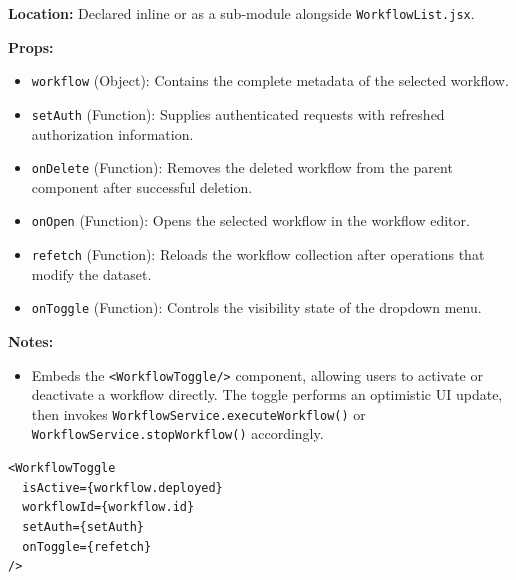 \vspace{0.2cm}
\noindent\textbf{Location:} Declared inline or as a sub-module alongside \texttt{WorkflowList.jsx}.

\vspace{0.2cm}
\noindent\textbf{Props:}
\begin{itemize}
    \item \texttt{workflow} (Object): Contains the complete metadata of the selected workflow.
    \item \texttt{setAuth} (Function): Supplies authenticated requests with refreshed authorization information.
    \item \texttt{onDelete} (Function): Removes the deleted workflow from the parent component after successful deletion.
    \item \texttt{onOpen} (Function): Opens the selected workflow in the workflow editor.
    \item \texttt{refetch} (Function): Reloads the workflow collection after operations that modify the dataset.
    \item \texttt{onToggle} (Function): Controls the visibility state of the dropdown menu.
\end{itemize}

\vspace{0.2cm}
\noindent\textbf{Notes:}
\begin{itemize}
    \item Embeds the \texttt{<WorkflowToggle/>} component, allowing users to activate or deactivate a workflow directly. The toggle performs an optimistic UI update, then invokes \texttt{WorkflowService.executeWorkflow()} or \texttt{WorkflowService.stopWorkflow()} accordingly.
\end{itemize}

\begin{center}
\begin{minipage}{0.6\textwidth}
\begin{lstlisting}
<WorkflowToggle
  isActive={workflow.deployed}
  workflowId={workflow.id}
  setAuth={setAuth}
  onToggle={refetch}
/>
\end{lstlisting}
\end{minipage}
\end{center}

